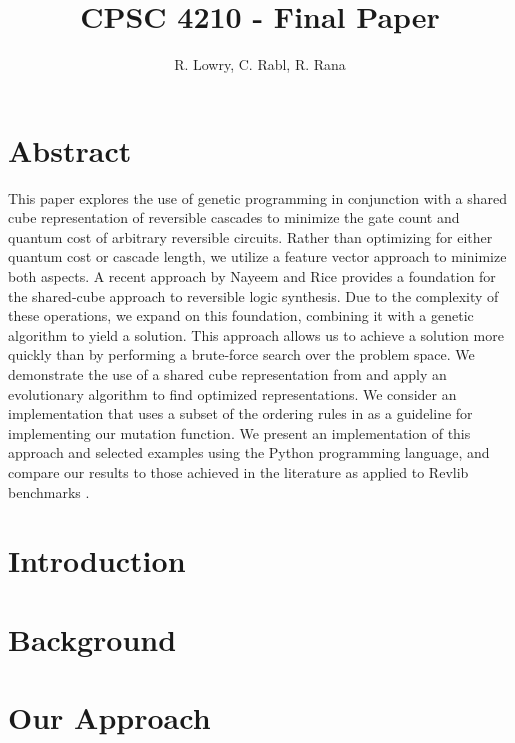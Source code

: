 \documentclass[12pt]{article}
\title{CPSC 4210 - Final Paper}
\author{R. Lowry, C. Rabl, R. Rana}
\date{}
\begin{document}
\maketitle

\section*{Abstract}

This paper explores the use of genetic programming in conjunction with a shared cube representation of reversible cascades to minimize the gate count and quantum cost of arbitrary reversible circuits. Rather than optimizing for either quantum cost or cascade length, we utilize a feature vector approach to minimize both aspects. A recent approach by Nayeem and Rice provides a foundation for the shared-cube approach to reversible logic synthesis. Due to the complexity of these operations, we expand on this foundation, combining it with a genetic algorithm to yield a solution. This approach allows us to achieve a solution more quickly than by performing a brute-force search over the problem space.
We demonstrate the use of a shared cube representation from \cite{Nayeem2011} and apply an evolutionary algorithm to find optimized representations. We consider an implementation that uses a subset of the ordering rules in \cite{Rice2011} as a guideline for implementing our mutation function. We present an implementation of this approach and selected examples using the Python programming language, and compare our results to those achieved in the literature as applied to Revlib benchmarks \cite{RevLib}.


\begingroup
\let\clearpage\relax
\section{Introduction}



\section{Background}










\section{Our Approach}







\endgroup

\pagebreak


\end{document}
